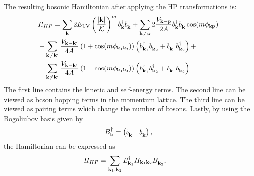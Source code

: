 \documentclass[english,aps,prd,nofootinbib,twocolumn]{revtex4-1}
\begin{document}
The resulting bosonic Hamiltonian after applying the HP transformations is:
\begin{equation}
\label{eq:Supp:HP-Hamiltonian}
\begin{split}
&H_{HP} = \sum_{\mathbf{k}} 
2 E_{\mathrm{UV} }
\left(\frac{|\mathbf{k}|}{\mathcal{K}}\right)^{m} 
b_{\mathbf{k }}^{\textcolor{black}{\dagger}}
b_{\mathbf{k }}^{\textcolor{white}{\dagger}}
+
\sum_{\mathbf{k}\neq \mathbf{p}} 2
\frac{V_{\mathbf{k-p}}}{2A}
b_{\mathbf{k }}^{\textcolor{black}{\dagger}}
b_{\mathbf{k }}^{\textcolor{white}{\dagger}}
\cos (m\phi_{\mathbf{k }\mathbf{p }})
\\ &+ 
\sum_{\mathbf{k}\neq \mathbf{k'}} 
\frac{V_{\mathbf{k-k'}}}{4A}
\left( 1 + \cos(m\phi_{\mathbf{k}_{1}\mathbf{k}_{2}}) \right) 
\left(	
b_{\mathbf{k}_{1}}^{\textcolor{black}{\dagger}}
b_{\mathbf{k}_{2}}^{\textcolor{white}{\dagger}} + 
b_{\mathbf{k}_{1}}^{\textcolor{white}{\dagger}}
b_{\mathbf{k}_{2}}^{\textcolor{black}{\dagger}}
\right) + 
\\ &+ 
\sum_{\mathbf{k}\neq \mathbf{k'}} 
\frac{V_{\mathbf{k-k'}}}{4A}
\left( 1 - \cos(m\phi_{\mathbf{k}_{1}\mathbf{k}_{2}}) \right) 
\left(	
b_{\mathbf{k}_{1}}^{\textcolor{black}{\dagger}}
b_{\mathbf{k}_{2}}^{\textcolor{black}{\dagger}} + 
b_{\mathbf{k}_{1}}^{\textcolor{white}{\dagger}}
b_{\mathbf{k}_{2}}^{\textcolor{white}{\dagger}}
\right). 
\end{split}
\end{equation}
The first line contains the kinetic and self-energy terms. The second line can be viewed as boson hopping terms in the momentum lattice. The third line can be viewed as pairing terms which change the number of bosons. Lastly, by using the Bogoliubov basis given by
\begin{equation}
\label{eq:Supp:Bogoliubov-basis}
B^{\dagger}_{\mathbf{k}} = 
\begin{pmatrix}
b^{\textcolor{black}{\dagger}}_{\mathbf{k}}	&	
b^{\textcolor{white}{\dagger}}_{\mathbf{k}}
\end{pmatrix},
\end{equation}
the Hamiltonian can be expressed as 
\begin{equation}
\label{eq:HP-Hamiltonian}
\begin{split}
&H_{HP} = %
\sum_{\mathbf{k}_{1},\mathbf{k}_{2}} 
B_{\mathbf{k }_{1}}^{\textcolor{black}{\dagger}}
H_{\mathbf{k }_{1}\mathbf{k }_{2}}
B_{\mathbf{k }_{2}}^{\textcolor{white}{\dagger}}, 
\end{split}
\end{equation}
\end{document}
